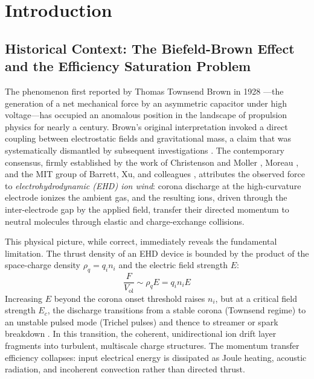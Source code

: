 \documentclass[12pt,twocolumn]{article}
\begin{document}
\begin{abstract}
\medskip
\noindent
\textbf{Keywords:} electrohydrodynamic propulsion, plasma instability,
entropy production, FPGA feedback control, Navier-Stokes--Maxwell
coupling, Landauer principle, active flow control
\end{abstract}

\section{Introduction}
\label{sec:introduction}

\subsection{Historical Context: The Biefeld-Brown Effect and the
  Efficiency Saturation Problem}
\label{sec:intro:history}

The phenomenon first reported by Thomas Townsend Brown in 1928
\cite{Brown1928}---the generation of a net mechanical force by an
asymmetric capacitor under high voltage---has occupied an anomalous
position in the landscape of propulsion physics for nearly a century.
Brown's original interpretation invoked a direct coupling between
electrostatic fields and gravitational mass, a claim that was
systematically dismantled by subsequent investigations
\cite{Christenson1967, Tajmar2004, Canning2004}. The contemporary
consensus, firmly established by the work of Christenson and Moller
\cite{Christenson1967}, Moreau \cite{Moreau2007}, and the MIT group
of Barrett, Xu, and colleagues \cite{Xu2018}, attributes the
observed force to \emph{electrohydrodynamic (EHD) ion wind}: corona
discharge at the high-curvature electrode ionizes the ambient gas,
and the resulting ions, driven through the inter-electrode gap by
the applied field, transfer their directed momentum to neutral
molecules through elastic and charge-exchange collisions.

This physical picture, while correct, immediately reveals the
fundamental limitation. The thrust density of an EHD device is
bounded by the product of the space-charge density $\rho_q = q_i n_i$
and the electric field strength $E$:
\begin{equation}
  \frac{F}{V_{\mathrm{ol}}} \sim \rho_q E
  = q_i n_i E
  \label{eq:intro:thrust_density}
\end{equation}
Increasing $E$ beyond the corona onset threshold raises $n_i$, but
at a critical field strength $E_c$, the discharge transitions from
a stable corona (Townsend regime) to an unstable pulsed mode
(Trichel pulses) and thence to streamer or spark breakdown
\cite{Raizer1991, Moreau2007}. In this transition, the coherent,
unidirectional ion drift layer fragments into turbulent, multiscale
charge structures. The momentum transfer efficiency collapses:
input electrical energy is dissipated as Joule heating, acoustic
radiation, and incoherent convection rather than directed thrust.
\end{document}
